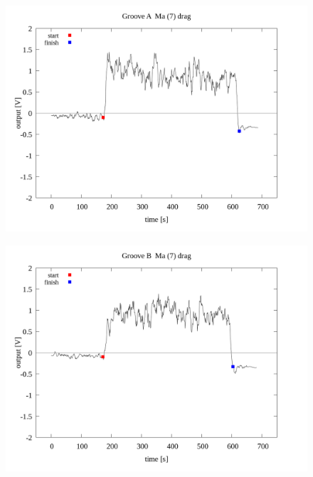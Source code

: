 \documentclass[a4paper]{jsarticle}
\begin{document}
\begin{figure}[htbp]
    \footnotesize
    \begin{center}
        \includegraphics[width=140mm]{../../../../33_result/210806/moving_average/7/drag/02/Groove_A_ma(7)_drag_02.png}
    \end{center}
\end{figure}

\begin{figure}[htbp]
    \footnotesize
    \begin{center}
        \includegraphics[width=140mm]{../../../../33_result/210806/moving_average/7/drag/02/Groove_B_ma(7)_drag_02.png}
    \end{center}
\end{figure}
\end{document}
